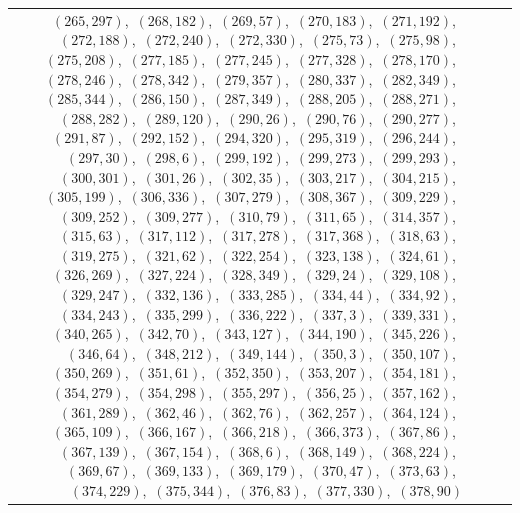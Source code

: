 \documentclass[11pt]{article}
\begin{document}
\begin{longtable}{@{}rrl>{\raggedright\arraybackslash}p{}@{}}
$(265,297)$,\allowbreak\ $(268,182)$,\allowbreak\ $(269,57)$,\allowbreak\ $(270,183)$,\allowbreak\ $(271,192)$,\allowbreak\ $(272,188)$,\allowbreak\ $(272,240)$,\allowbreak\ $(272,330)$,\allowbreak\ $(275,73)$,\allowbreak\ $(275,98)$,\allowbreak\ $(275,208)$,\allowbreak\ $(277,185)$,\allowbreak\ $(277,245)$,\allowbreak\ $(277,328)$,\allowbreak\ $(278,170)$,\allowbreak\ $(278,246)$,\allowbreak\ $(278,342)$,\allowbreak\ $(279,357)$,\allowbreak\ $(280,337)$,\allowbreak\ $(282,349)$,\allowbreak\ $(285,344)$,\allowbreak\ $(286,150)$,\allowbreak\ $(287,349)$,\allowbreak\ $(288,205)$,\allowbreak\ $(288,271)$,\allowbreak\ $(288,282)$,\allowbreak\ $(289,120)$,\allowbreak\ $(290,26)$,\allowbreak\ $(290,76)$,\allowbreak\ $(290,277)$,\allowbreak\ $(291,87)$,\allowbreak\ $(292,152)$,\allowbreak\ $(294,320)$,\allowbreak\ $(295,319)$,\allowbreak\ $(296,244)$,\allowbreak\ $(297,30)$,\allowbreak\ $(298,6)$,\allowbreak\ $(299,192)$,\allowbreak\ $(299,273)$,\allowbreak\ $(299,293)$,\allowbreak\ $(300,301)$,\allowbreak\ $(301,26)$,\allowbreak\ $(302,35)$,\allowbreak\ $(303,217)$,\allowbreak\ $(304,215)$,\allowbreak\ $(305,199)$,\allowbreak\ $(306,336)$,\allowbreak\ $(307,279)$,\allowbreak\ $(308,367)$,\allowbreak\ $(309,229)$,\allowbreak\ $(309,252)$,\allowbreak\ $(309,277)$,\allowbreak\ $(310,79)$,\allowbreak\ $(311,65)$,\allowbreak\ $(314,357)$,\allowbreak\ $(315,63)$,\allowbreak\ $(317,112)$,\allowbreak\ $(317,278)$,\allowbreak\ $(317,368)$,\allowbreak\ $(318,63)$,\allowbreak\ $(319,275)$,\allowbreak\ $(321,62)$,\allowbreak\ $(322,254)$,\allowbreak\ $(323,138)$,\allowbreak\ $(324,61)$,\allowbreak\ $(326,269)$,\allowbreak\ $(327,224)$,\allowbreak\ $(328,349)$,\allowbreak\ $(329,24)$,\allowbreak\ $(329,108)$,\allowbreak\ $(329,247)$,\allowbreak\ $(332,136)$,\allowbreak\ $(333,285)$,\allowbreak\ $(334,44)$,\allowbreak\ $(334,92)$,\allowbreak\ $(334,243)$,\allowbreak\ $(335,299)$,\allowbreak\ $(336,222)$,\allowbreak\ $(337,3)$,\allowbreak\ $(339,331)$,\allowbreak\ $(340,265)$,\allowbreak\ $(342,70)$,\allowbreak\ $(343,127)$,\allowbreak\ $(344,190)$,\allowbreak\ $(345,226)$,\allowbreak\ $(346,64)$,\allowbreak\ $(348,212)$,\allowbreak\ $(349,144)$,\allowbreak\ $(350,3)$,\allowbreak\ $(350,107)$,\allowbreak\ $(350,269)$,\allowbreak\ $(351,61)$,\allowbreak\ $(352,350)$,\allowbreak\ $(353,207)$,\allowbreak\ $(354,181)$,\allowbreak\ $(354,279)$,\allowbreak\ $(354,298)$,\allowbreak\ $(355,297)$,\allowbreak\ $(356,25)$,\allowbreak\ $(357,162)$,\allowbreak\ $(361,289)$,\allowbreak\ $(362,46)$,\allowbreak\ $(362,76)$,\allowbreak\ $(362,257)$,\allowbreak\ $(364,124)$,\allowbreak\ $(365,109)$,\allowbreak\ $(366,167)$,\allowbreak\ $(366,218)$,\allowbreak\ $(366,373)$,\allowbreak\ $(367,86)$,\allowbreak\ $(367,139)$,\allowbreak\ $(367,154)$,\allowbreak\ $(368,6)$,\allowbreak\ $(368,149)$,\allowbreak\ $(368,224)$,\allowbreak\ $(369,67)$,\allowbreak\ $(369,133)$,\allowbreak\ $(369,179)$,\allowbreak\ $(370,47)$,\allowbreak\ $(373,63)$,\allowbreak\ $(374,229)$,\allowbreak\ $(375,344)$,\allowbreak\ $(376,83)$,\allowbreak\ $(377,330)$,\allowbreak\ $(378,90)$\\

\end{longtable}
\end{document}
